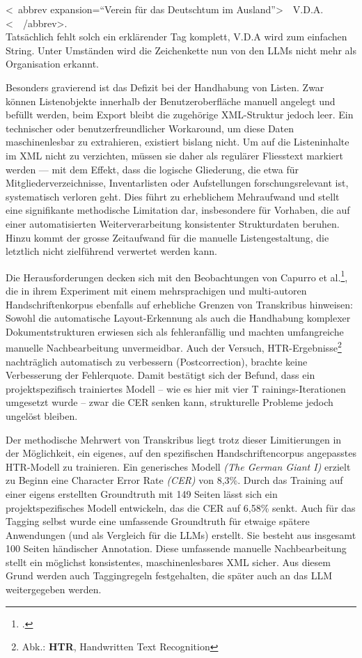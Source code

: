 \documentclass[12pt, a4paper, ngerman, bidi=default]{article}
\let\cite\footcite
\begin{document}
\colorbox{VeryLightGray}{\textless~abbrev expansion=\enquote{Verein für das Deutschtum im Ausland}\textgreater\ \ V.D.A.\textless\ \ /abbrev\textgreater}.\\
Tatsächlich fehlt solch ein erklärender Tag komplett, V.D.A wird zum einfachen String. Unter Umständen wird die Zeichenkette nun von den LLMs nicht mehr als Organisation erkannt. 

Besonders gravierend ist das Defizit bei der Handhabung von Listen. Zwar können Listenobjekte innerhalb der
 Benutzeroberfläche manuell angelegt und befüllt werden, beim Export bleibt die zugehörige XML-Struktur jedoch leer. 
 Ein technischer oder benutzerfreundlicher Workaround, um diese Daten maschinenlesbar zu extrahieren, existiert bislang nicht. 
 Um auf die Listeninhalte im XML nicht zu verzichten, müssen sie daher als regulärer Fliesstext markiert werden — 
 mit dem Effekt, dass die logische Gliederung, die etwa für Mitgliederverzeichnisse, Inventarlisten oder Aufstellungen 
 forschungsrelevant ist, systematisch verloren geht. Dies führt zu erheblichem Mehraufwand und stellt eine signifikante methodische 
 Limitation dar, insbesondere für Vorhaben, die auf einer automatisierten Weiterverarbeitung konsistenter Strukturdaten beruhen. 
 Hinzu kommt der grosse Zeitaufwand für die manuelle Listengestaltung, die letztlich nicht zielführend verwertet werden kann.

Die Herausforderungen decken sich mit den Beobachtungen von Capurro et al.\cite[][]{capurro_experimenting_2023}, die in
 ihrem Experiment mit einem mehrsprachigen und multi-autoren Handschriftenkorpus ebenfalls auf erhebliche Grenzen von 
 Transkribus hinweisen: Sowohl die automatische Layout-Erkennung als auch die Handhabung komplexer Dokumentstrukturen erwiesen 
 sich als fehleranfällig und machten umfangreiche manuelle Nachbearbeitung unvermeidbar. Auch der Versuch, 
 HTR-Ergebnisse\footnote{Abk.: \textbf{HTR}, Handwritten Text Recognition} nachträglich automatisch zu verbessern (Postcorrection), 
 brachte keine Verbesserung der Fehlerquote. Damit bestätigt sich der Befund, dass ein projektspezifisch trainiertes Modell – wie es hier mit vier T
 rainings-Iterationen umgesetzt wurde – zwar die CER senken kann, strukturelle Probleme jedoch ungelöst bleiben.

Der methodische Mehrwert von Transkribus liegt trotz dieser Limitierungen in der Möglichkeit, ein eigenes, auf den spezifischen Handschriftencorpus 
angepasstes HTR-Modell zu trainieren. Ein generisches Modell \textit{(The German Giant I)} erzielt zu Beginn eine Character Error Rate \textit{(CER)} von 8,3\%. 
Durch das Training auf einer eigens erstellten Groundtruth mit 149 Seiten lässt sich ein projektspezifisches Modell entwickeln, das die CER auf 6,58\% senkt. 
Auch für das Tagging selbst wurde eine umfassende Groundtruth für etwaige spätere Anwendungen (und als Vergleich für die LLMs) erstellt. Sie besteht aus insgesamt
 100 Seiten händischer Annotation. Diese umfassende manuelle Nachbearbeitung stellt ein möglichst konsistentes, maschinenlesbares XML sicher. Aus diesem Grund 
 werden auch Taggingregeln festgehalten, die später auch an das LLM weitergegeben werden.
\end{document}
